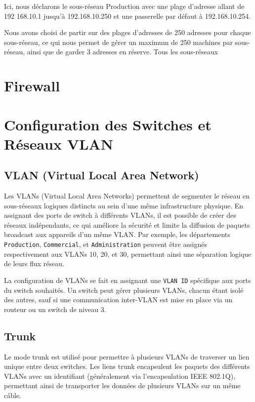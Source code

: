 \documentclass[a4paper,12pt]{report}
\begin{document}
                Ici, nous déclarons le sous-réseau Production avec une plage d'adresse allant de 192
                168.10.1 jusqu'à 192.168.10.250 et une passerelle par défaut à 192.168.10.254.

                Nous avons choisi de partir sur des plages d'adresses de 250 adresses pour chaque sous-réseau, ce qui nous permet de gérer un maximum de 250 machines par sous-réseau, ainsi que de garder 3 adresses en réserve.
                Tous les sous-réseaux 



        \section{Firewall}
        \section{Configuration des Switches et Réseaux VLAN}

\subsection{VLAN (Virtual Local Area Network)}
Les VLANs (Virtual Local Area Networks) permettent de segmenter le réseau en sous-réseaux logiques distincts au sein d'une même infrastructure physique. En assignant des ports de switch à différents VLANs, il est possible de créer des réseaux indépendants, ce qui améliore la sécurité et limite la diffusion de paquets broadcast aux appareils d'un même VLAN. Par exemple, les départements \texttt{Production}, \texttt{Commercial}, et \texttt{Administration} peuvent être assignés respectivement aux VLANs 10, 20, et 30, permettant ainsi une séparation logique de leurs flux réseau.

La configuration de VLANs se fait en assignant une \texttt{VLAN ID} spécifique aux ports du switch souhaités. Un switch peut gérer plusieurs VLANs, chacun étant isolé des autres, sauf si une communication inter-VLAN est mise en place via un routeur ou un switch de niveau 3.

\subsection{Trunk}
Le mode trunk est utilisé pour permettre à plusieurs VLANs de traverser un lien unique entre deux switches. Les liens trunk encapsulent les paquets des différents VLANs avec un identifiant (généralement via l'encapsulation IEEE 802.1Q), permettant ainsi de transporter les données de plusieurs VLANs sur un même câble.
\end{document}
